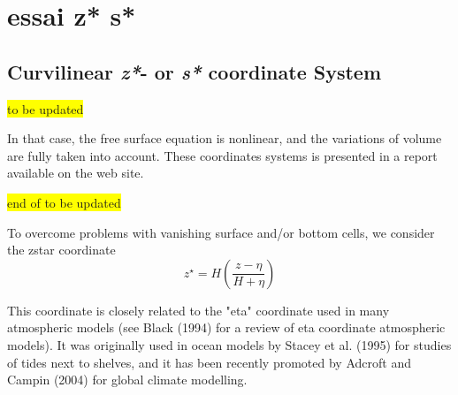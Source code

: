 \chapter{ essai z* s*}
\section{Curvilinear \textit{z*}- or \textit{s*} coordinate System}


\colorbox{yellow}{ to be updated }

In that case, the free surface equation is nonlinear, and the variations of 
volume are fully taken into account. These coordinates systems is presented in 
a report \citep{Levier2007} available on the \NEMO web site. 

\colorbox{yellow}{  end of to be updated}
\newline


To overcome problems with vanishing surface and/or bottom cells, we consider the 
zstar coordinate 
\begin{equation} \label{PE_}
	z^\star = H \left( \frac{z-\eta}{H+\eta} \right)
\end{equation}

This coordinate is closely related to the "eta" coordinate used in many atmospheric 
models (see Black (1994) for a review of eta coordinate atmospheric models). It 
was originally used in ocean models by Stacey et al. (1995) for studies of tides 
next to shelves, and it has been recently promoted by Adcroft and Campin (2004) 
for global climate modelling.

